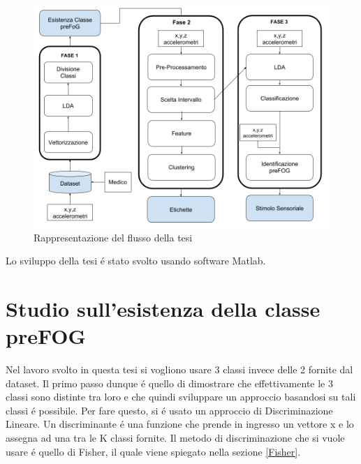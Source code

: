 \begin{figure}[]
	\centering
	\includegraphics[scale=0.35]{images/FlussoTesi.png}
	\caption{Rappresentazione del flusso della tesi}
	\label{FlussoTesi}
\end{figure}
Lo sviluppo della tesi é stato svolto usando software Matlab.

\section{Studio sull'esistenza della classe preFOG}
Nel lavoro svolto in questa tesi si vogliono usare 3 classi invece delle 2 fornite dal dataset. Il primo passo dunque é quello di dimostrare che effettivamente le 3 classi sono distinte tra loro e che quindi sviluppare un approccio basandosi su tali classi é possibile. Per fare questo, si é usato un approccio di Discriminazione Lineare. Un discriminante é una funzione che prende in ingresso un vettore x e lo assegna ad una tra le K classi fornite. Il metodo di discriminazione che si vuole usare é quello di Fisher, il quale viene spiegato nella sezione \ref{Fisher}.\\
